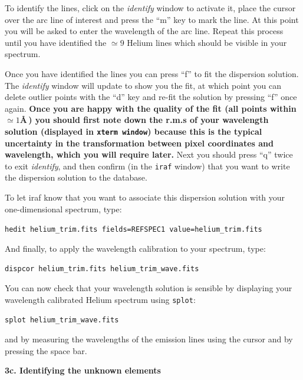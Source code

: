 \documentclass[12pt]{article}
\begin{document}
To identify the lines, click on the {\it identify} window to activate
it, place the cursor over the arc line of interest and press the ``m''
key to mark the line. At this point you will be asked to enter the
wavelength of the arc line. Repeat this process
until you have identified the $\simeq 9$ Helium lines which should be
visible in your spectrum. 

\noindent
Once you have
identified the lines you can press ``f'' to fit the dispersion
solution. The {\it identify} window will update to show you the fit,
at which point you can delete outlier points with the ``d'' key and
re-fit the solution by pressing ``f'' once again. {\bf Once you are happy
with the quality of the fit (all points within $\simeq1$\AA\,) you
should first note down the r.m.s of your wavelength solution (displayed in
{\tt xterm window}) because this is the typical uncertainty in the 
transformation between pixel coordinates and wavelength, which you will require later.}
Next you should press ``q'' twice to exit {\it identify}, and then
confirm (in the {\tt iraf} window) that you want to write the dispersion solution to the database. 

To let {\sc iraf} know that you want to associate this dispersion
solution with your one-dimensional spectrum, type:

{\tt hedit helium\verb,_trim,.fits fields=REFSPEC1 value=helium\verb,_trim,.fits}

And finally, to apply the wavelength calibration to your spectrum, type:

{\tt dispcor helium\verb,_trim.fits helium_trim_wave.fits,}

You can now check that your wavelength solution is sensible by
displaying your wavelength calibrated Helium spectrum using {\tt splot}:

{\tt splot \verb,helium_trim_wave.fits,}

and by measuring the wavelengths of the emission lines using the
cursor and by pressing the space bar.

\newpage


\bigskip
{\bf 3c. Identifying the unknown elements}
\end{document}

